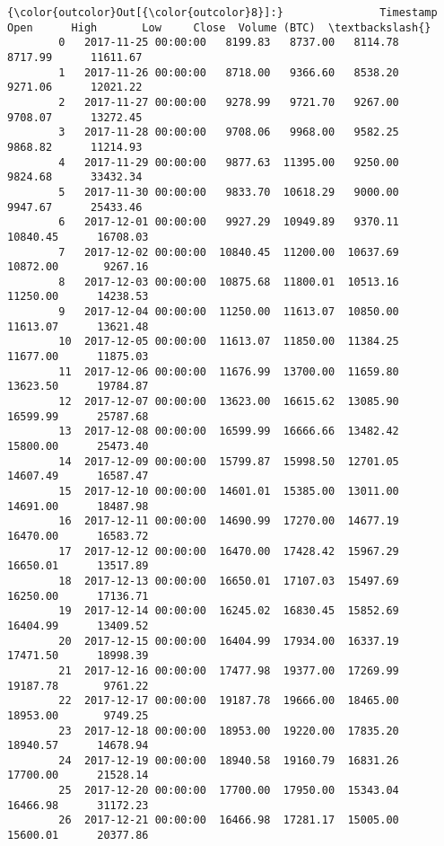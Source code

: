 \documentclass[11pt]{article}
\begin{document}
\begin{Verbatim}[commandchars=\\\{\}]
{\color{outcolor}Out[{\color{outcolor}8}]:}               Timestamp      Open      High       Low     Close  Volume (BTC)  \textbackslash{}
        0   2017-11-25 00:00:00   8199.83   8737.00   8114.78   8717.99      11611.67   
        1   2017-11-26 00:00:00   8718.00   9366.60   8538.20   9271.06      12021.22   
        2   2017-11-27 00:00:00   9278.99   9721.70   9267.00   9708.07      13272.45   
        3   2017-11-28 00:00:00   9708.06   9968.00   9582.25   9868.82      11214.93   
        4   2017-11-29 00:00:00   9877.63  11395.00   9250.00   9824.68      33432.34   
        5   2017-11-30 00:00:00   9833.70  10618.29   9000.00   9947.67      25433.46   
        6   2017-12-01 00:00:00   9927.29  10949.89   9370.11  10840.45      16708.03   
        7   2017-12-02 00:00:00  10840.45  11200.00  10637.69  10872.00       9267.16   
        8   2017-12-03 00:00:00  10875.68  11800.01  10513.16  11250.00      14238.53   
        9   2017-12-04 00:00:00  11250.00  11613.07  10850.00  11613.07      13621.48   
        10  2017-12-05 00:00:00  11613.07  11850.00  11384.25  11677.00      11875.03   
        11  2017-12-06 00:00:00  11676.99  13700.00  11659.80  13623.50      19784.87   
        12  2017-12-07 00:00:00  13623.00  16615.62  13085.90  16599.99      25787.68   
        13  2017-12-08 00:00:00  16599.99  16666.66  13482.42  15800.00      25473.40   
        14  2017-12-09 00:00:00  15799.87  15998.50  12701.05  14607.49      16587.47   
        15  2017-12-10 00:00:00  14601.01  15385.00  13011.00  14691.00      18487.98   
        16  2017-12-11 00:00:00  14690.99  17270.00  14677.19  16470.00      16583.72   
        17  2017-12-12 00:00:00  16470.00  17428.42  15967.29  16650.01      13517.89   
        18  2017-12-13 00:00:00  16650.01  17107.03  15497.69  16250.00      17136.71   
        19  2017-12-14 00:00:00  16245.02  16830.45  15852.69  16404.99      13409.52   
        20  2017-12-15 00:00:00  16404.99  17934.00  16337.19  17471.50      18998.39   
        21  2017-12-16 00:00:00  17477.98  19377.00  17269.99  19187.78       9761.22   
        22  2017-12-17 00:00:00  19187.78  19666.00  18465.00  18953.00       9749.25   
        23  2017-12-18 00:00:00  18953.00  19220.00  17835.20  18940.57      14678.94   
        24  2017-12-19 00:00:00  18940.58  19160.79  16831.26  17700.00      21528.14   
        25  2017-12-20 00:00:00  17700.00  17950.00  15343.04  16466.98      31172.23   
        26  2017-12-21 00:00:00  16466.98  17281.17  15005.00  15600.01      20377.86   

\end{Verbatim}
\end{document}
